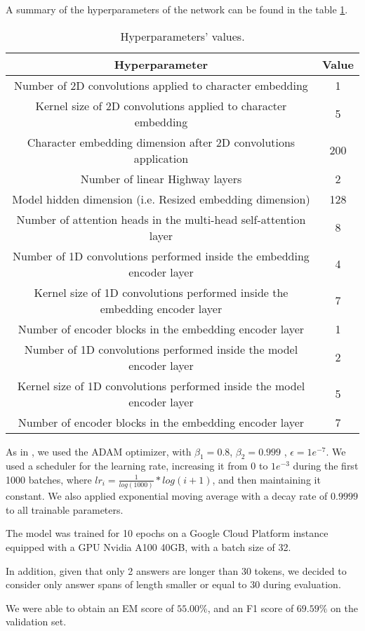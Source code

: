     A summary of the hyperparameters of the network can be found in the table \ref{table:hyperparameters}.

    \begin{table}
        \begin{tabular}{|c c|} 
            \hline
            Hyperparameter & Value \\
            \hline
            Number of 2D convolutions applied to character embedding & 1 \\ 
            Kernel size of 2D convolutions applied to character embedding & 5 \\
            Character embedding dimension after 2D convolutions application & 200 \\
            Number of linear Highway layers & 2 \\
            Model hidden dimension (i.e. Resized embedding dimension) & 128 \\
            Number of attention heads in the multi-head self-attention layer & 8 \\
            Number of 1D convolutions performed inside the embedding encoder layer & 4 \\
            Kernel size of 1D convolutions performed inside the embedding encoder layer & 7 \\
            Number of encoder blocks in the embedding encoder layer & 1 \\
            Number of 1D convolutions performed inside the model encoder layer & 2 \\
            Kernel size of 1D convolutions performed inside the model encoder layer & 5 \\
            Number of encoder blocks in the embedding encoder layer & 7 \\
            \hline
        \end{tabular}
        \caption{Hyperparameters' values.\label{table:hyperparameters}}
    \end{table}

    \vspace{0.5cm}

    As in \cite{yu2018qanet}, we used the ADAM optimizer\cite{kingma2017adam}, with $\beta_{1} = 0.8$, $\beta_{2} = 0.999$ , $\epsilon = 1e^{-7}$. 
    We used a scheduler for the learning rate, increasing it from $0$ to $1e^{-3}$ during the first 1000 batches, 
    where $lr_{i} = \frac{1}{log(1000)} * log(i+1)$, and then maintaining it constant.
    We also applied exponential moving average with a decay rate of $0.9999$ to all trainable parameters.

    The model was trained for 10 epochs on a Google Cloud Platform instance equipped with a GPU Nvidia A100 40GB, with a batch size of 32.

    In addition, given that only 2 answers are longer than 30 tokens, we decided to consider only answer spans of length smaller or equal to $30$ during evaluation.

    We were able to obtain an EM score of $55.00\%$, and an F1 score of $69.59\%$ on the validation set.
